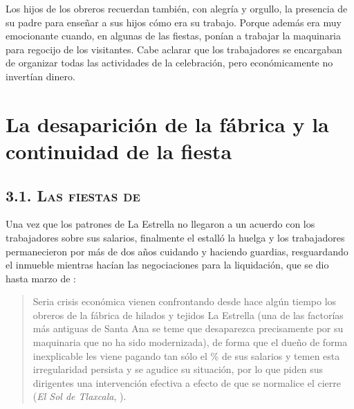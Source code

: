 \documentclass[14pt,letterpaper,twoside]{extbook} %
\begin{document}
\noindent Los hijos de los obreros recuerdan también, con alegría y orgullo, la presencia de su padre para enseñar a sus hijos cómo era su trabajo. Porque además era muy emocionante cuando, en algunas de las fiestas, ponían a trabajar la maquinaria para regocijo de los visitantes. Cabe aclarar que los trabajadores se encargaban de organizar todas las actividades de la celebración, pero económicamente no invertían dinero.

\begin{center}
\dag
\end{center}

\chapter{\mdseries La desaparición de la fábrica y la continuidad de la fiesta}\label{Capitulo_3}
\pagestyle{fancy}
\fancyhf{}
\fancyfoot[RO,LE]{\hfill \thepage \hfill}
\section*{\mdseries\large\textsc{3.1. Las fiestas de }}

\noindent Una vez que los patrones de La Estrella no llegaron a un acuerdo con los trabajadores sobre sus salarios, finalmente el  estalló la huelga y los trabajadores permanecieron por más de dos años cuidando y haciendo guardias, resguardando el inmueble mientras hacían las negociaciones para la liquidación, que se dio hasta marzo de :

\begin{quotation}
\noindent Seria crisis económica vienen confrontando desde hace algún tiempo los  obreros de la fábrica de hilados y tejidos La Estrella (una de las factorías más antiguas de Santa Ana se teme que desaparezca precisamente por su maquinaria que no ha sido modernizada), de forma que el dueño de forma inexplicable les viene pagando tan sólo el \% de sus salarios y temen esta irregularidad persista y se agudice su situación, por lo que piden sus dirigentes una intervención efectiva a efecto de que se normalice el cierre (\textit{El Sol de Tlaxcala}, ).
\end{quotation}
\end{document}
